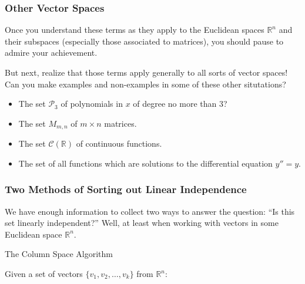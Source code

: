 \documentclass[10pt,]{book}
\theoremstyle{plain}
\theoremstyle{definition}
\numberwithin{equation}{section}
\begin{document}
\subsubsection[Other Vector Spaces]{Other Vector Spaces}\label{subsubsection-39}

        Once you understand these terms as they apply to the Euclidean
        spaces \(\mathbb{R}^n\) and their subspaces (especially those
        associated to matrices), you should pause to admire your achievement.
\par

        But next, realize that those terms apply generally to all sorts of
        vector spaces! Can you make examples and non-examples in some of
        these other situtations?
\begin{itemize}
\item{}
          The set \(\mathcal{P}_3\) of polynomials in \(x\) of degree
          no more than 3?
        \item{}
          The set \(M_{m,n}\) of \(m\times n\) matrices.
        \item{}
          The set \(\mathcal{C}(\mathbb{R})\) of continuous functions.
        \item{}
          The set of all functions which are solutions to the differential
          equation \(y'' = y\).
        \end{itemize}
\typeout{************************************************}
\typeout{************************************************}
\subsubsection[Two Methods of Sorting out Linear Independence]{Two Methods of Sorting out Linear Independence}\label{subsubsection-40}

        We have enough information to collect two ways to answer the question:
        ``Is this set linearly independent?''
        Well, at least when working with vectors in some Euclidean space
        \(\mathbb{R}^n\).

        The Column Space Algorithm
        
          Given a set of vectors \(\{v_1, v_2, \ldots, v_k\}\) from
          \(\mathbb{R}^n\):
\end{document}
